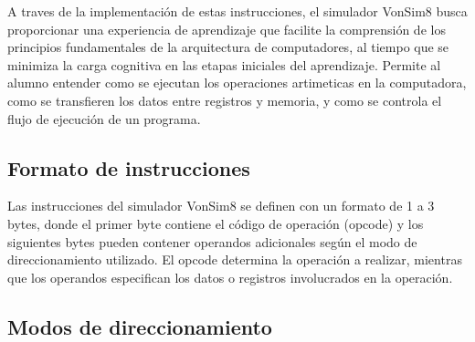 \documentclass[12pt,oneside]{templates/unerthesis}
\begin{document}
A traves de la implementación de estas instrucciones, el simulador VonSim8 busca proporcionar una experiencia de aprendizaje que facilite la comprensión de los principios fundamentales de la arquitectura de computadores, al tiempo que se minimiza la carga cognitiva en las etapas iniciales del aprendizaje. Permite al alumno entender como se ejecutan los operaciones artimeticas en la computadora, como se transfieren los datos entre registros y memoria, y como se controla el flujo de ejecución de un programa.

\hypertarget{formato-de-instrucciones}{%
\subsection{Formato de instrucciones}\label{formato-de-instrucciones}}

Las instrucciones del simulador VonSim8 se definen con un formato de 1 a 3 bytes, donde el primer byte contiene el código de operación (opcode) y los siguientes bytes pueden contener operandos adicionales según el modo de direccionamiento utilizado. El opcode determina la operación a realizar, mientras que los operandos especifican los datos o registros involucrados en la operación.

\begin{table}[!h]
\centering
\caption{\label{tab:formatoinst}Tabla de formato de instrucciones}
\centering
{}
\end{table}

\hypertarget{modos-de-direccionamiento-1}{%
\subsection{Modos de direccionamiento}\label{modos-de-direccionamiento-1}}
\end{document}
